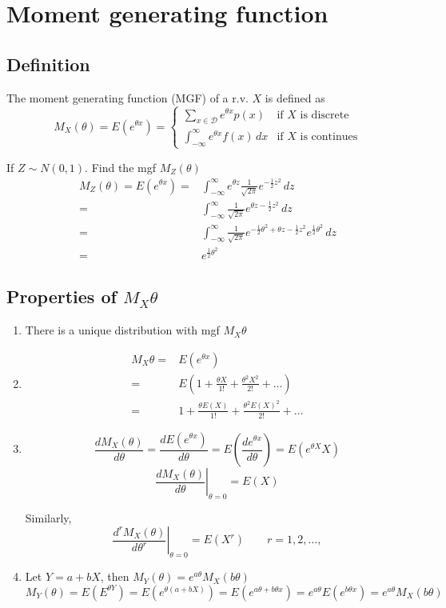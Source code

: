 \appendix
\chapter{Moment generating function}
\section{Definition}
\begin{defn}
The moment generating function (MGF) of a r.v. $X$ is defined as
\[M_X(\theta)=E(e^{\theta x})=\begin{cases}
\sum_{x \in \mathcal{D}} e^{\theta x} p(x) & \text{if }X \text{ is discrete}	\\
\int_{-\infty}^{\infty} e^{\theta x} f(x)\,dx & \text{if }X \text{ is continues}	
\end{cases} \]
\end{defn}

\begin{exmp}
If $Z \sim N(0,1)$. Find the mgf $M_Z(\theta)$
\begin{align*}
M_Z(\theta)=E(e^{\theta x})=& \int_{-\infty}^{\infty} e^{\theta z} \frac{1}{\sqrt{2 \pi}} e^{-\frac{1}{2} z^2} \, dz \\
= & \int_{-\infty}^{\infty}  \frac{1}{\sqrt{2 \pi}} e^{\theta z-\frac{1}{2} z^2} \,dz\\
= & \int_{-\infty}^{\infty}  \frac{1}{\sqrt{2 \pi}} e^{-\frac{1}{2}\theta^2 + \theta z-\frac{1}{2} z^2 } e^{\frac{1}{2}\theta^2} \,dz\\
= & e^{\frac{1}{2} \theta^2}
\end{align*}
\end{exmp}

\section{Properties of $M_X{\theta}$}
\begin{prop}
\begin{enumerate}
\item There is a unique distribution with mgf $M_X{\theta}$
\item \begin{align*}
M_X{\theta}=& E(e^{\theta x}) \\
=& E\left(1+\frac{\theta X}{1!}+ \frac{\theta^2 X^2}{2!}+\dots \right) \\
=& 1+\frac{\theta E(X)}{1!}+ \frac{\theta^2 E(X)^2}{2!}+\dots
\end{align*}
\item 
\[\frac{d M_X(\theta)}{d \theta}=\frac{d E(e^{\theta x})}{d \theta}=E\left(\frac{d e^{\theta x}}{d \theta}\right)=E(e^{\theta X} X)\]
\[\left.\frac{d M_X(\theta)}{d \theta}\right|_{\theta=0}=E(X)\]

Similarly,
\[\left.\frac{d^r M_X(\theta)}{d \theta^r}\right|_{\theta=0}=E(X^r) \qquad r=1,2,\dots,\]
\item Let $Y=a+bX$, then $M_Y(\theta)=e^{a\theta} M_X(b\theta)$
\[M_Y(\theta)=E(E^{\theta Y})=E(e^{\theta (a+bX)})=E(e^{a\theta+b\theta x})=e^{a\theta} E(e^{b\theta x})=e^{a \theta}M_X(b\theta)\]
\end{enumerate}
\end{prop}

